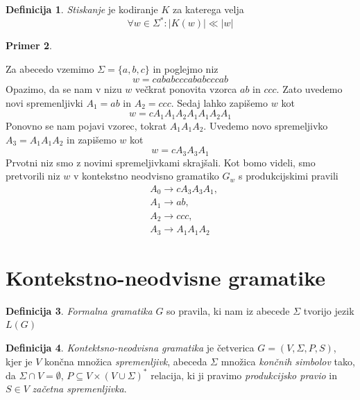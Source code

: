 \documentclass{amsart}
\theoremstyle{definition} %
\newtheorem{definicija}{Definicija}[section]
\newtheorem{primer}[definicija]{Primer}
\theoremstyle{plain} %
\begin{document}
\begin{definicija}
    
    \textit{Stiskanje} je kodiranje $ K $ za katerega velja 
    \[ 
    \forall w \in \Sigma^* \colon \left\lvert K(w)\right\rvert \ll \left\lvert w \right\rvert
    \]

\end{definicija}

\begin{primer}\label{Kompresija}
    
    Za abecedo vzemimo $ \Sigma = \{ a,b,c \} $ in poglejmo niz
    \[
        w = cababcccababcccab
    \]
    Opazimo, da se nam v nizu $ w $ večkrat ponovita vzorca $ ab $ in $ ccc $. Zato
    uvedemo novi spremenljivki $ A_1 = ab $ in $ A_2 = ccc $. Sedaj lahko zapišemo $ w $ kot
    \[
        w = cA_1A_1A_2A_1A_1A_2A_1
    \]
    Ponovno se nam pojavi vzorec, tokrat $ A_1A_1A_2 $. Uvedemo novo spremeljivko $ A_3 = A_1A_1A_2 $
    in zapišemo $ w $ kot
    \[
        w = cA_3A_3A_1
    \]
    Prvotni niz smo z novimi spremeljivkami skrajšali. Kot bomo videli, smo
    pretvorili niz $ w $ v kontekstno neodvisno gramatiko $ G_w $ s
    produkcijskimi pravili
    \begin{align*}
        & A_0  \rightarrow  cA_3A_3A_1, \\
        & A_1  \rightarrow  ab, \\
        & A_2  \rightarrow  ccc, \\
        & A_3  \rightarrow  A_1A_1A_2
    \end{align*}

\end{primer}

\section{Kontekstno-neodvisne gramatike}

\begin{definicija}

    \textit{Formalna gramatika} $ G $ so pravila, ki nam iz abecede $ \Sigma $ tvorijo jezik
    $ L(G) $

\end{definicija}

\begin{definicija}

    \textit{Kontektsno-neodvisna gramatika} je četverica $ G = ( V, \Sigma, P, S ) $, kjer je
    $ V $ končna množica \textit{spremenljivk}, abeceda $ \Sigma $ množica \textit{končnih simbolov} tako,
    da $ \Sigma \cap V = \emptyset $, $ P \subseteq V \times ( V \cup \Sigma )^* $ relacija, ki ji
    pravimo \textit{produkcijsko pravio} in $ S \in V $ \textit{začetna spremenljivka}.

\end{definicija}
\end{document}
